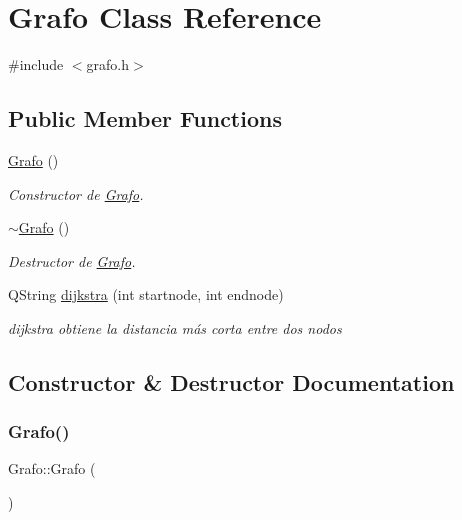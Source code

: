 \hypertarget{class_grafo}{}\section{Grafo Class Reference}
\label{class_grafo}


{\ttfamily \#include $<$grafo.\+h$>$}

\subsection*{Public Member Functions}
\begin{DoxyCompactItemize}
\item 
\hyperlink{class_grafo_ab810bbe26a98e9af6661ccddff66b03b}{Grafo} ()
\begin{DoxyCompactList}\small\item\em Constructor de \hyperlink{class_grafo}{Grafo}. \end{DoxyCompactList}\item 
\hyperlink{class_grafo_a16f3fbba0de2667dfba3b657cb7e95ff}{$\sim$\+Grafo} ()
\begin{DoxyCompactList}\small\item\em Destructor de \hyperlink{class_grafo}{Grafo}. \end{DoxyCompactList}\item 
Q\+String \hyperlink{class_grafo_a8fe931a9a154866add1bf763dcb88c12}{dijkstra} (int startnode, int endnode)
\begin{DoxyCompactList}\small\item\em dijkstra obtiene la distancia más corta entre dos nodos \end{DoxyCompactList}\end{DoxyCompactItemize}


\subsection{Constructor \& Destructor Documentation}
\mbox{\label{class_grafo_ab810bbe26a98e9af6661ccddff66b03b}} 
\subsubsection{\texorpdfstring{Grafo()}{Grafo()}}
{\footnotesize\ttfamily Grafo\+::\+Grafo (\begin{DoxyParamCaption}{ }\end{DoxyParamCaption})}



